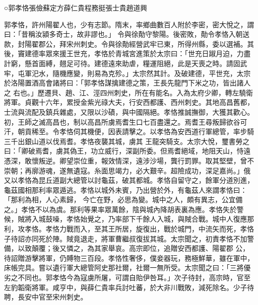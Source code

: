 
\begin{pinyinscope}

 ○郭孝恪張儉蘇定方薛仁貴程務挺張士貴趙道興



 郭孝恪，許州陽翟人也，少有志節。隋末，率鄉曲數百人附於李密，密大悅之，謂曰：「昔稱汝潁多奇士，故非謬也。」
 令與徐勣守黎陽。後密敗，勣令孝恪入朝送款，封陽翟郡公，拜宋州刺史。令與徐勣經營武牢已東，所得州縣，委以選補。其後，竇建德率眾來援王世充，孝恪於青城宮進策於太宗曰：「世充日踧月迫，力盡計窮，懸首面縛，翹足可待。建德遠來助虐，糧運阻絕，此是天喪之時。請固武牢，屯軍汜水，隨機應變，則易為克殄。」太宗然其計。及破建德，平世充，太宗於洛陽置酒高會諸將曰：「郭孝恪謀擒建德之策，王長先龍門下米之功，皆出諸人之
 右也。」歷遷貝、趙、江、涇四州刺史，所在有能名。入為太府少卿，轉左驍衛將軍。貞觀十六年，累授金紫光祿大夫，行安西都護、西州刺史。其地高昌舊都，士流與流配及鎮兵雜處，又限以沙磧，與中國隔絕。孝恪推誠撫御，大獲其歡心。初，王師之滅高昌也，制以高昌所虜焉耆生口七百盡還之。焉耆王尋叛歸欲谷可汗，朝貢稀至。令孝恪伺其機便，因表請擊之。以孝恪為安西道行軍總管，率步騎三千出銀山道以伐焉耆。孝恪夜襲其城，虜其
 王龍突騎支。太宗大悅，璽書勞之曰：「卿破焉耆，虜其偽王，功立威行，深副所委。但焉耆絕域，地阻天山，恃遠憑深，敢懷叛逆。卿望崇位重，報效情深，遠涉沙場，龔行罰罪。取其堅壁，曾不崇朝；再廓游魂，遂無遺寇。糸面思竭力，必大艱辛。超險成功，深足嘉尚。」俄又以孝恪為昆丘道副大總管以討龜茲，破其都城。孝恪自留守之，餘軍分道別進，龜茲國相那利率眾遁逃。孝恪以城外未賓，乃出營於外，有龜茲人來謂孝恪曰：「那利為相，人心素歸，
 今亡在野，必思為變。城中之人，頗有異志，公宜備之。」孝恪不以為虞。那利等果率眾萬餘，陰與城內降胡表裏為應。孝恪失於警候，賊將入城鼓噪，孝恪始覺之，乃率部下千餘人入城，與賊合戰。城中人復應那利，攻孝恪。孝恪力戰而入，至其王所居，旋復出，戰於城門，中流矢而死，孝恪子待詔亦同死於陣。賊竟退走，將軍曹繼叔復拔其城。太宗聞之，初責孝恪不加警備，以致顛覆；後又憐之，為其家舉哀。高宗即位，追贈安西都護、陽翟郡
 公，待詔贈游擊將軍，仍賻物三百段。孝恪性奢侈，僕妾器玩，務極鮮華，雖在軍中，床帳完具。嘗以遺行軍大總管阿史那社爾，社爾一無所受。太宗聞之曰：「三將優劣之不同也。郭孝恪今為寇虜所屠，可謂自貽伊咎耳。」次子待封，高宗時，官至左豹韜衛將軍。咸亨中，與薛仁貴率兵討吐蕃，於大非川戰敗，減死除名。少子待聘，長安中官至宋州刺史。




\end{pinyinscope}
